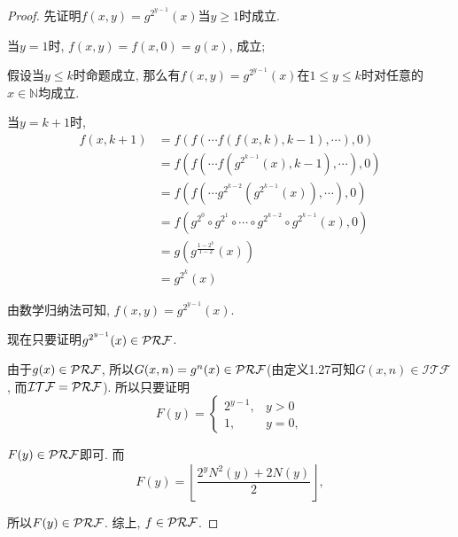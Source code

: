 \begin{proof}
    先证明$f(x,y)=g^{2^{y-1}}(x)$当$y\geqslant 1$时成立.

    当$y=1$时, $f(x,y)=f(x,0)=g(x)$, 成立;

    假设当$y\leqslant k$时命题成立, 那么有$f(x,y)=g^{2^{y-1}}(x)$在$1\leqslant y\leqslant k$时对任意的$x\in\mathbb{N}$均成立.

    当$y=k+1$时, $$\begin{aligned}
        f(x,k+1)&=f(f(\cdots f(f(x,k),k-1),\cdots),0)\\
        &=f(f(\cdots f(g^{2^{k-1}}(x),k-1),\cdots), 0)\\
        &=f(f(\cdots g^{2^{k-2}}(g^{2^{k-1}}(x)),\cdots), 0)\\
        &=f(g^{2^0}\circ g^{2^1}\circ \cdots \circ g^{2^{k-2}}\circ g^{2^{k-1}}(x),0)\\
        &=g(g^{\frac{1-2^k}{1-2}}(x))\\
        &=g^{2^k}(x)
    \end{aligned}$$
	
    由数学归纳法可知, $f(x,y)=g^{2^{y-1}}(x)$.
    
    现在只要证明$g^{2^{y-1}}(x)\in\mathcal{PRF}$.

    由于$g(x)\in\mathcal{PRF}$, 所以$G(x,n)=g^n(x)\in\mathcal{PRF}$(由定义1.27可知$G(x,n)\in\mathcal{ITF}$, 而$\mathcal{ITF}=\mathcal{PRF}$). 所以只要证明$$F(y)=\begin{cases}
        2^{y-1},&y>0\\
        1,&y=0,
    \end{cases}$$
	
	$F(y)\in\mathcal{PRF}$即可.
    而$$F(y)=\left\lfloor\frac{2^yN^2(y)+2N(y)}{2}\right\rfloor,$$
	
	所以$F(y)\in\mathcal{PRF}$.
    综上, $f\in\mathcal{PRF}$.
\end{proof}